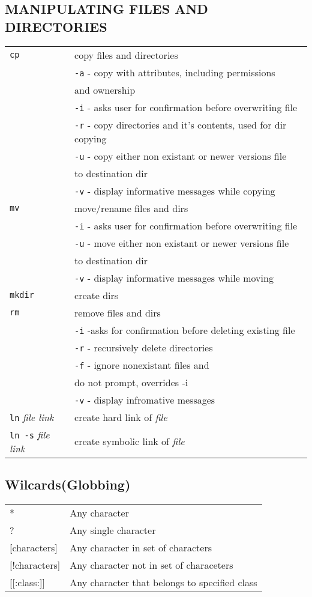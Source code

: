 \documentclass[8pt]{extarticle}
\begin{document}
\begin{multicols}{2}
\section{MANIPULATING FILES AND DIRECTORIES}

\begin{tabular}{ll}
\texttt{cp} & copy files and directories\\
& \texttt{-a} - copy with attributes, including permissions \\
& and ownership\\
& \texttt{-i} - asks user for confirmation before overwriting file\\
& \texttt{-r} - copy directories and it's contents, used for dir copying\\
& \texttt{-u} - copy either non existant or newer versions file\\ 
& to destination dir\\
& \texttt{-v} - display informative messages while copying\\
\texttt{mv} & move/rename files and dirs\\
& \texttt{-i} - asks user for confirmation before overwriting file\\
& \texttt{-u} - move either non existant or newer versions file\\
& to destination dir\\
& \texttt{-v} - display informative messages while moving\\
\texttt{mkdir} & create dirs\\
\texttt{rm} & remove files and dirs\\
& \texttt{-i} -asks for confirmation before deleting existing file\\
& \texttt{-r} - recursively delete directories\\
& \texttt{-f} - ignore nonexistant files and\\
& do not prompt, overrides -i\\
& \texttt{-v} - display infromative messages\\
\texttt{ln} \textit{file link} & create hard link of \textit{file}\\
\texttt{ln -s} \textit{file link} & create symbolic link of \textit{file}\\
\end{tabular}

\subsection{Wilcards(Globbing)}
\begin{tabular}{ll}
* & Any character\\
? & Any single character\\
{[characters]} & Any character in set of characters\\
{[!characters]} & Any character not in set of characeters\\
{[[:class:]]} & Any character that belongs to specified class\\
\end{tabular}


\end{multicols}
\end{document}
